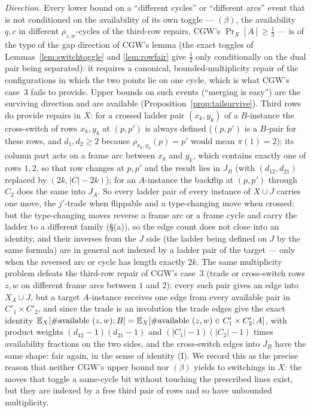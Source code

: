 \emph{Direction.}  Every lower bound on a ``different cycles'' or
``different arcs'' event that is not conditioned on the availability
of its own toggle --- $(\beta)$, the availability $q,c$ in different
$\rho_{z,w}$-cycles of the third-row repairs, CGW's
$\Pr_X[A]\ge\tfrac13$ --- is of the type of the gap direction of
CGW's lemma (the exact toggles of Lemmas~\ref{lem:switchtoggle} and
\ref{lem:rowfair} give $\tfrac12$ only conditionally on the dual pair
being separated): it requires a canonical, bounded-multiplicity repair of
the configurations in which the two points lie on one cycle, which is
what CGW's case~3 fails to provide.  Upper bounds on such events
(``merging is easy'') are the surviving direction and are available
(Proposition~\ref{prop:tailsurvive}).  Third rows do provide repairs
in $X$: for a crossed ladder pair $(x_k,y_k)$ of a $B$-instance the
cross-switch of rows $x_k,y_k$ at $(p,p')$ is always defined ($(p,p')$
is a $B$-pair for these rows, and $d_1,d_2\ge2$ because
$\rho_{x_k,y_k}(p)=p'$ would mean $\pi(1)=2$); its column part acts on
a frame arc between $x_k$ and $y_k$, which contains exactly one of rows
$1,2$, so that row changes at $p,p'$ and the result lies in $J_B$
(with $(d_{12},d_{21})$ replaced by $(2k,|C|-2k)$); for an
$A$-instance the backflip at $(p,p')$ through $C_2$ does the same into
$J_A$.  So every ladder
pair of every instance of $X\cup J$ carries one move, the $j'$-trade
when flippable and a type-changing move when crossed; but the
type-changing moves reverse a frame arc or a frame cycle and carry
the ladder to a different family (\S(a)), so the edge count does not
close into an identity, and their inverses from the $J$ side (the
ladder being defined on $J$ by the same formula) are in general not
indexed by a ladder pair of the target --- only when the reversed arc
or cycle has length exactly $2k$.  The same multiplicity
problem defeats the third-row repair of CGW's case~3 (trade or
cross-switch rows $z,w$ on different frame arcs between $1$ and $2$):
every such pair gives an edge into $X_A\cup J$, but a target $A$-instance
receives one edge from every available pair in $C'_1\times C'_2$, and
since the trade is an involution the trade edges give the exact
identity $\mathbb{E}_X[\#\text{available }(z,w);B]=\mathbb{E}_X[\#\text{available }(z,w)\in C'_1\times C'_2;A]$,
with product weights $(d_{12}-1)(d_{21}-1)$ and $(|C_1|-1)(|C_2|-1)$
times availability fractions on the two sides, and the cross-switch
edges into $J_B$ have the same shape: fair again, in the sense of
identity (I).  We record this as the precise reason that neither CGW's
upper bound nor $(\beta)$ yields to switchings in $X$: the moves that
toggle a same-cycle bit without touching the prescribed lines exist,
but they are indexed by a free third pair of rows and so have
unbounded multiplicity.

